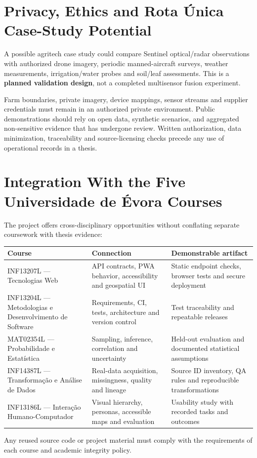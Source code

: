 \section{Privacy, Ethics and Rota Única Case-Study Potential}

A possible agritech case study could compare Sentinel optical/radar observations with authorized drone imagery, periodic manned-aircraft surveys, weather measurements, irrigation/water probes and soil/leaf assessments. This is a \textbf{planned validation design}, not a completed multisensor fusion experiment.

Farm boundaries, private imagery, device mappings, sensor streams and supplier credentials must remain in an authorized private environment. Public demonstrations should rely on open data, synthetic scenarios, and aggregated non-sensitive evidence that has undergone review. Written authorization, data minimization, traceability and source-licensing checks precede any use of operational records in a thesis.

\section{Integration With the Five Universidade de Évora Courses}

The project offers cross-disciplinary opportunities without conflating separate coursework with thesis evidence:

\begin{table}[h]
\centering
\begin{tabular}{lll}
\toprule
Course & Connection & Demonstrable artifact \\
\midrule
INF13207L — Tecnologias Web & API contracts, PWA behavior, accessibility and geospatial UI & Static endpoint checks, browser tests and secure deployment \\
INF13204L — Metodologias e Desenvolvimento de Software & Requirements, CI, tests, architecture and version control & Test traceability and repeatable releases \\
MAT02354L — Probabilidade e Estatística & Sampling, inference, correlation and uncertainty & Held-out evaluation and documented statistical assumptions \\
INF14387L — Transformação e Análise de Dados & Real-data acquisition, missingness, quality and lineage & Source ID inventory, QA rules and reproducible transformations \\
INF13186L — Interação Humano-Computador & Visual hierarchy, personas, accessible maps and evaluation & Usability study with recorded tasks and outcomes \\
\bottomrule
\end{tabular}
\end{table}
Any reused source code or project material must comply with the requirements of each course and academic integrity policy.

